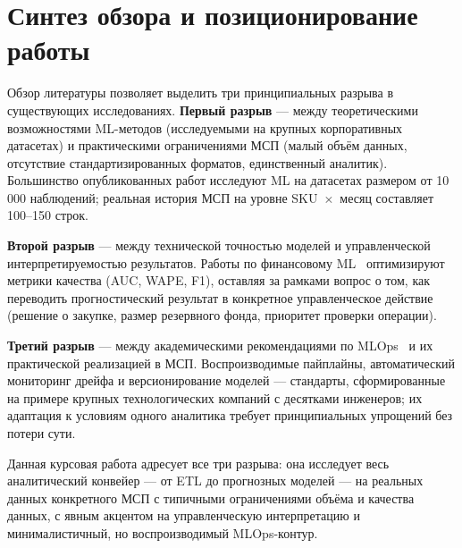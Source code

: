 \section{Синтез обзора и позиционирование работы}

Обзор литературы позволяет выделить три принципиальных разрыва в существующих исследованиях. \textbf{Первый разрыв} --- между теоретическими возможностями ML-методов (исследуемыми на крупных корпоративных датасетах) и практическими ограничениями МСП (малый объём данных, отсутствие стандартизированных форматов, единственный аналитик). Большинство опубликованных работ исследуют ML на датасетах размером от 10\,000 наблюдений; реальная история МСП на уровне SKU~$\times$~месяц составляет 100--150 строк.

\textbf{Второй разрыв} --- между технической точностью моделей и управленческой интерпретируемостью результатов. Работы по финансовому ML~\cite{lopezdeprado2018advances,khandani2010consumer} оптимизируют метрики качества (AUC, WAPE, F1), оставляя за рамками вопрос о том, как переводить прогностический результат в конкретное управленческое действие (решение о закупке, размер резервного фонда, приоритет проверки операции).

\textbf{Третий разрыв} --- между академическими рекомендациями по MLOps~\cite{sculley2015hidden} и их практической реализацией в МСП. Воспроизводимые пайплайны, автоматический мониторинг дрейфа и версионирование моделей --- стандарты, сформированные на примере крупных технологических компаний с десятками инженеров; их адаптация к условиям одного аналитика требует принципиальных упрощений без потери сути.

Данная курсовая работа адресует все три разрыва: она исследует весь аналитический конвейер --- от ETL до прогнозных моделей --- на реальных данных конкретного МСП с типичными ограничениями объёма и качества данных, с явным акцентом на управленческую интерпретацию и минималистичный, но воспроизводимый MLOps-контур.
